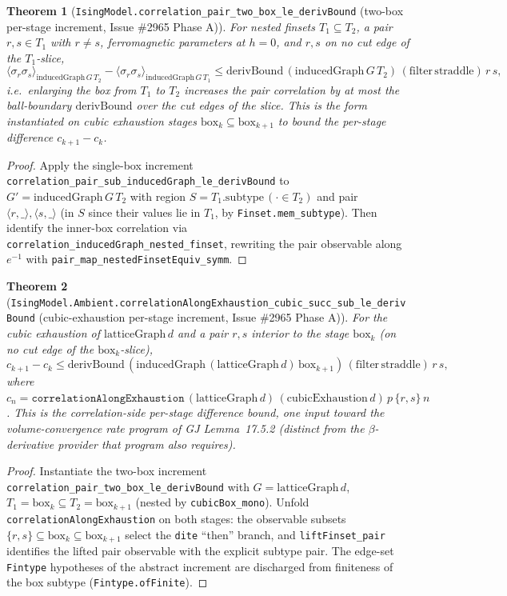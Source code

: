\documentclass[a4paper,11pt]{article}
\newtheorem{theorem}{Theorem}
\begin{document}
\begin{theorem}[\texttt{IsingModel.correlation\_pair\_two\_box\_le\_derivBound}
(two-box per-stage increment, Issue \#2965 Phase A)]
For nested finsets $T_1\subseteq T_2$, a pair $r,s\in T_1$ with $r\neq s$,
ferromagnetic parameters at $h=0$, and $r,s$ on no cut edge of the $T_1$-slice,
\[
  \langle\sigma_r\sigma_s\rangle_{\mathrm{inducedGraph}\,G\,T_2}
    - \langle\sigma_r\sigma_s\rangle_{\mathrm{inducedGraph}\,G\,T_1}
  \le \mathrm{derivBound}\,(\mathrm{inducedGraph}\,G\,T_2)\,
    (\mathrm{filter}\,\mathrm{straddle})\,r\,s,
\]
i.e.\ enlarging the box from $T_1$ to $T_2$ increases the pair correlation by at
most the ball-boundary $\mathrm{derivBound}$ over the cut edges of the slice. This
is the form instantiated on cubic exhaustion stages $\mathrm{box}_k\subseteq
\mathrm{box}_{k+1}$ to bound the per-stage difference $c_{k+1}-c_k$.
\end{theorem}

\begin{proof}
Apply the single-box increment
\texttt{correlation\_pair\_sub\_inducedGraph\_le\_derivBound} to
$G'=\mathrm{inducedGraph}\,G\,T_2$ with region
$S=T_1.\mathrm{subtype}\,(\cdot\in T_2)$ and pair $\langle r,\_\rangle,
\langle s,\_\rangle$ (in $S$ since their values lie in $T_1$, by
\texttt{Finset.mem\_subtype}). Then identify the inner-box correlation via
\texttt{correlation\_inducedGraph\_nested\_finset}, rewriting the pair observable
along $e^{-1}$ with \texttt{pair\_map\_nestedFinsetEquiv\_symm}.
\end{proof}

\begin{theorem}[\texttt{IsingModel.Ambient.correlationAlongExhaustion\_cubic\_succ\_sub\_le\_derivBound}
(cubic-exhaustion per-stage increment, Issue \#2965 Phase A)]
For the cubic exhaustion of $\mathrm{latticeGraph}\,d$ and a pair $r,s$ interior to
the stage $\mathrm{box}_k$ (on no cut edge of the $\mathrm{box}_k$-slice),
\[
  c_{k+1}-c_k
  \le \mathrm{derivBound}\,(\mathrm{inducedGraph}\,(\mathrm{latticeGraph}\,d)\,
    \mathrm{box}_{k+1})\,(\mathrm{filter}\,\mathrm{straddle})\,r\,s,
\]
where $c_n=\texttt{correlationAlongExhaustion}\,(\mathrm{latticeGraph}\,d)\,
(\mathrm{cubicExhaustion}\,d)\,p\,\{r,s\}\,n$. This is the correlation-side
per-stage difference bound, one input toward the volume-convergence rate program
of GJ Lemma~17.5.2 (distinct from the $\beta$-derivative provider that program also
requires).
\end{theorem}

\begin{proof}
Instantiate the two-box increment
\texttt{correlation\_pair\_two\_box\_le\_derivBound} with
$G=\mathrm{latticeGraph}\,d$, $T_1=\mathrm{box}_k\subseteq T_2=\mathrm{box}_{k+1}$
(nested by \texttt{cubicBox\_mono}). Unfold \texttt{correlationAlongExhaustion} on
both stages: the observable subsets $\{r,s\}\subseteq\mathrm{box}_k\subseteq
\mathrm{box}_{k+1}$ select the \texttt{dite} ``then'' branch, and
\texttt{liftFinset\_pair} identifies the lifted pair observable with the explicit
subtype pair. The edge-set \texttt{Fintype} hypotheses of the abstract increment are
discharged from finiteness of the box subtype (\texttt{Fintype.ofFinite}).
\end{proof}
\end{document}
